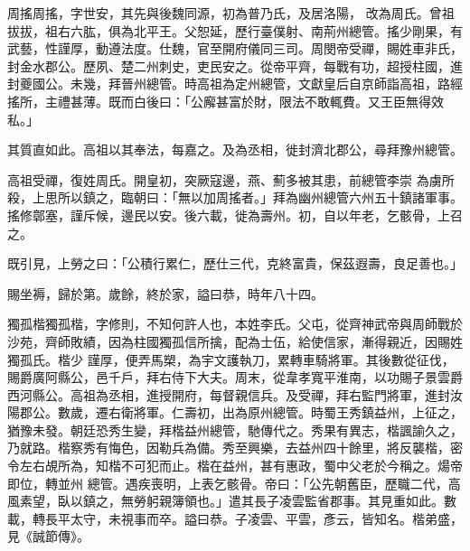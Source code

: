 \begin{pinyinscope}
 周搖周搖，字世安，其先與後魏同源，初為普乃氏，及居洛陽，
 改為周氏。曾祖拔拔，祖右六肱，俱為北平王。父恕延，歷行臺僕射、南荊州總管。搖少剛果，有武藝，性謹厚，動遵法度。仕魏，官至開府儀同三司。周閔帝受禪，賜姓車非氏，封金水郡公。歷夙、楚二州刺史，吏民安之。從帝平齊，每戰有功，超授柱國，進封夔國公。未幾，拜晉州總管。時高祖為定州總管，文獻皇后自京師詣高祖，路經搖所，主禮甚薄。既而白後曰：「公廨甚富於財，限法不敢輒費。又王臣無得效私。」



 其質直如此。高祖以其奉法，每嘉之。及為丞相，徙封濟北郡公，尋拜豫州總管。



 高祖受禪，復姓周氏。開皇初，突厥寇邊，燕、薊多被其患，前總管李崇
 為虜所殺，上思所以鎮之，臨朝曰：「無以加周搖者。」拜為幽州總管六州五十鎮諸軍事。搖修鄣塞，謹斥候，邊民以安。後六載，徙為壽州。初，自以年老，乞骸骨，上召之。



 既引見，上勞之曰：「公積行累仁，歷仕三代，克終富貴，保茲遐壽，良足善也。」



 賜坐褥，歸於第。歲餘，終於家，謚曰恭，時年八十四。



 獨孤楷獨孤楷，字修則，不知何許人也，本姓李氏。父屯，從齊神武帝與周師戰於沙苑，齊師敗績，因為柱國獨孤信所擒，配為士伍，給使信家，漸得親近，因賜姓獨孤氏。楷少
 謹厚，便弄馬槊，為宇文護執刀，累轉車騎將軍。其後數從征伐，賜爵廣阿縣公，邑千戶，拜右侍下大夫。周末，從韋孝寬平淮南，以功賜子景雲爵西河縣公。高祖為丞相，進授開府，每督親信兵。及受禪，拜右監門將軍，進封汝陽郡公。數歲，遷右衛將軍。仁壽初，出為原州總管。時蜀王秀鎮益州，上征之，猶豫未發。朝廷恐秀生變，拜楷益州總管，馳傳代之。秀果有異志，楷諷諭久之，乃就路。楷察秀有悔色，因勒兵為備。秀至興樂，去益州四十餘里，將反襲楷，密令左右覘所為，知楷不可犯而止。楷在益州，甚有惠政，蜀中父老於今稱之。煬帝即位，轉並州
 總管。遇疾喪明，上表乞骸骨。帝曰：「公先朝舊臣，歷職二代，高風素望，臥以鎮之，無勞躬親簿領也。」遣其長子凌雲監省郡事。其見重如此。數載，轉長平太守，未視事而卒。謚曰恭。子凌雲、平雲，彥云，皆知名。楷弟盛，見《誠節傳》。




\end{pinyinscope}
